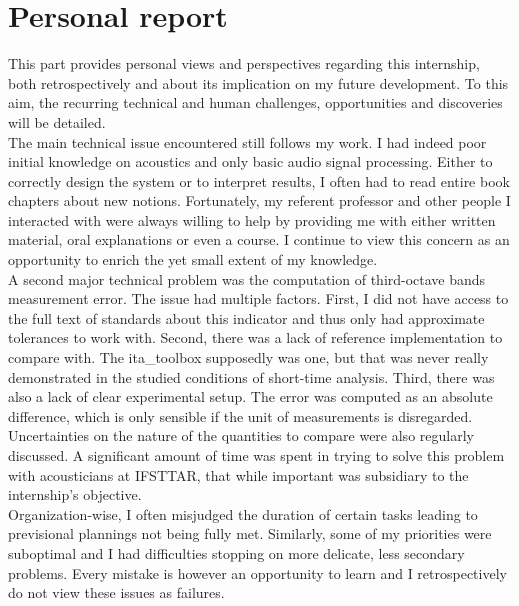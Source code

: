 \documentclass[12pt,times,onecolumn]{article}
\begin{document}
\clearpage
\part{Personal report}

This part provides personal views and perspectives regarding this internship, both retrospectively and about its implication on my future development. To this aim, the recurring technical and human challenges, opportunities and discoveries will be detailed.\\

The main technical issue encountered still follows my work. I had indeed poor initial knowledge on acoustics and only basic audio signal processing. Either to correctly design the system or to interpret results, I often had to read entire book chapters about new notions. Fortunately, my referent professor and other people I interacted with were always willing to help by providing me with either written material, oral explanations or even a course. I continue to view this concern as an opportunity to enrich the yet small extent of my knowledge.\\

A second major technical problem was the computation of third-octave bands measurement error. The issue had multiple factors. First, I did not have access to the full text of standards about this indicator and thus only had approximate tolerances to work with. Second, there was a lack of reference implementation to compare with. The ita\_toolbox supposedly was one, but that was never really demonstrated in the studied conditions of short-time analysis. Third, there was also a lack of clear experimental setup. The error was computed as an absolute difference, which is only sensible if the unit of measurements is disregarded. Uncertainties on the nature of the quantities to compare were also regularly discussed. A significant amount of time was spent in trying to solve this problem with acousticians at IFSTTAR, that while important was subsidiary to the internship's objective.\\

Organization-wise, I often misjudged the duration of certain tasks leading to previsional plannings not being fully met. Similarly, some of my priorities were suboptimal and I had difficulties stopping on more delicate, less secondary problems. Every mistake is however an opportunity to learn and I retrospectively do not view these issues as failures.\\
\end{document}
